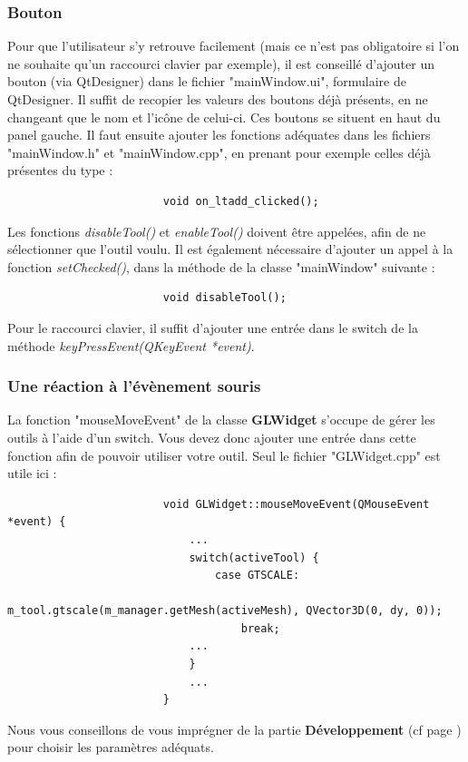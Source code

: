 \documentclass[a4paper]{memoir}
\begin{document}
				\subsubsection{Bouton}
					Pour que l'utilisateur s'y retrouve facilement (mais ce n'est pas obligatoire si l'on ne souhaite qu'un raccourci clavier par exemple), 
					il est conseillé d'ajouter un bouton (via QtDesigner) dans le fichier "mainWindow.ui", formulaire de QtDesigner. Il suffit de recopier 
					les valeurs des boutons déjà présents, en ne changeant que le nom et l'icône de celui-ci. Ces boutons se situent en haut du panel gauche.
					Il faut ensuite ajouter les fonctions adéquates dans les fichiers "mainWindow.h" et "mainWindow.cpp", en prenant pour exemple celles 
					déjà présentes du type :
					\begin{verbatim}
						void on_ltadd_clicked();
					\end{verbatim}
					Les fonctions \textit{disableTool()} et \textit{enableTool()} doivent être appelées, afin de ne sélectionner que l'outil voulu. Il est 
					également nécessaire d'ajouter un appel à la fonction \textit{setChecked()}, dans la méthode de la classe "mainWindow" suivante :
					\begin{verbatim}
						void disableTool();
					\end{verbatim}
					Pour le raccourci clavier, il suffit d'ajouter une entrée dans le switch de la méthode \textit{keyPressEvent(QKeyEvent *event)}.
					
				\subsubsection{Une réaction à l'évènement souris}
					La fonction "mouseMoveEvent" de la classe \textbf{GLWidget} s'occupe de gérer les outils à l'aide d'un switch. Vous devez donc ajouter 
					une entrée dans cette fonction afin de pouvoir utiliser votre outil. Seul le fichier "GLWidget.cpp" est utile ici :
					\begin{verbatim}
						void GLWidget::mouseMoveEvent(QMouseEvent *event) {
						    ...
						    switch(activeTool) {
						        case GTSCALE:
						            m_tool.gtscale(m_manager.getMesh(activeMesh), QVector3D(0, dy, 0));
						            break;
						    ...
						    }
						    ...
						}
					\end{verbatim}
					Nous vous conseillons de vous imprégner de la partie \textbf{Développement} (cf page \pageref{tool-dev}) pour 
					choisir les paramètres adéquats.
				
\end{document}
